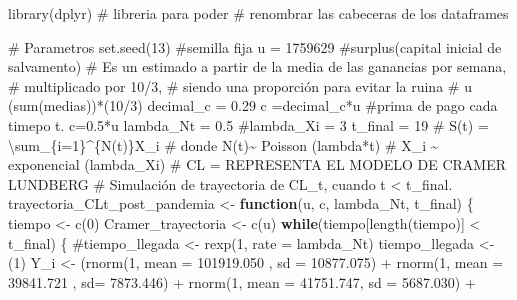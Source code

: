 \documentclass[
  us-letterpaper,
]{scrreprt}
\newenvironment{Shaded}{\begin{snugshade}}{\end{snugshade}}
\newcommand{\AttributeTok}[1]{\textcolor[rgb]{0.40,0.45,0.13}{#1}}
\newcommand{\CommentTok}[1]{\textcolor[rgb]{0.37,0.37,0.37}{#1}}
\newcommand{\ControlFlowTok}[1]{\textcolor[rgb]{0.00,0.23,0.31}{\textbf{#1}}}
\newcommand{\DecValTok}[1]{\textcolor[rgb]{0.68,0.00,0.00}{#1}}
\newcommand{\FloatTok}[1]{\textcolor[rgb]{0.68,0.00,0.00}{#1}}
\newcommand{\FunctionTok}[1]{\textcolor[rgb]{0.28,0.35,0.67}{#1}}
\newcommand{\NormalTok}[1]{\textcolor[rgb]{0.00,0.23,0.31}{#1}}
\newcommand{\OtherTok}[1]{\textcolor[rgb]{0.00,0.23,0.31}{#1}}
\newcommand{\SpecialCharTok}[1]{\textcolor[rgb]{0.37,0.37,0.37}{#1}}
\theoremstyle{definition}
\theoremstyle{plain}
\theoremstyle{plain}
\theoremstyle{remark}
\begin{document}
\begin{Shaded}
\begin{Highlighting}[]
\FunctionTok{library}\NormalTok{(dplyr) }\CommentTok{\# libreria para poder }
\CommentTok{\# renombrar las cabeceras de los dataframes}

\CommentTok{\# Parametros}
\FunctionTok{set.seed}\NormalTok{(}\DecValTok{13}\NormalTok{) }\CommentTok{\#semilla fija}
\NormalTok{u }\OtherTok{=} \DecValTok{1759629} \CommentTok{\#surplus(capital inicial de salvamento)}
\CommentTok{\# Es un estimado a partir de la media de las ganancias por semana, }
\CommentTok{\# multiplicado por 10/3, }
\CommentTok{\# siendo una proporción para evitar la ruina}
\CommentTok{\# u (sum(medias))*(10/3)}
\NormalTok{decimal\_c }\OtherTok{=} \FloatTok{0.29}
\NormalTok{c }\OtherTok{=}\NormalTok{decimal\_c}\SpecialCharTok{*}\NormalTok{u }\CommentTok{\#prima de pago cada timepo t. c=0.5*u}
\NormalTok{lambda\_Nt }\OtherTok{=} \FloatTok{0.5}
\CommentTok{\#lambda\_Xi = 3}
\NormalTok{t\_final }\OtherTok{=} \DecValTok{19}
\CommentTok{\# S(t) = \textbackslash{}sum\_\{i=1\}\^{}\{N(t)\}X\_i}
\CommentTok{\# donde N(t)\textasciitilde{} Poisson (lambda*t)}
\CommentTok{\# X\_i \textasciitilde{} exponencial (lambda\_Xi)}
\CommentTok{\# CL = REPRESENTA EL MODELO DE CRAMER LUNDBERG}
\CommentTok{\# Simulación de trayectoria de CL\_t, cuando t \textless{} t\_final.}
\NormalTok{trayectoria\_CLt\_post\_pandemia }\OtherTok{\textless{}{-}} \ControlFlowTok{function}\NormalTok{(u, c, lambda\_Nt, t\_final)}
\NormalTok{\{}
\NormalTok{  tiempo }\OtherTok{\textless{}{-}} \FunctionTok{c}\NormalTok{(}\DecValTok{0}\NormalTok{)}
\NormalTok{  Cramer\_trayectoria }\OtherTok{\textless{}{-}} \FunctionTok{c}\NormalTok{(u)}
  \ControlFlowTok{while}\NormalTok{(tiempo[}\FunctionTok{length}\NormalTok{(tiempo)] }\SpecialCharTok{\textless{}}\NormalTok{ t\_final)}
\NormalTok{  \{}
    \CommentTok{\#tiempo\_llegada \textless{}{-} rexp(1, rate = lambda\_Nt)}
\NormalTok{    tiempo\_llegada }\OtherTok{\textless{}{-}}\NormalTok{ (}\DecValTok{1}\NormalTok{)}
\NormalTok{    Y\_i }\OtherTok{\textless{}{-}}\NormalTok{  (}\FunctionTok{rnorm}\NormalTok{(}\DecValTok{1}\NormalTok{, }\AttributeTok{mean =} \FloatTok{101919.050}\NormalTok{ , }\AttributeTok{sd =} \FloatTok{10877.075}\NormalTok{) }\SpecialCharTok{+} 
              \FunctionTok{rnorm}\NormalTok{(}\DecValTok{1}\NormalTok{, }\AttributeTok{mean =}  \FloatTok{39841.721}\NormalTok{ , }\AttributeTok{sd=} \FloatTok{7873.446}\NormalTok{)  }\SpecialCharTok{+}  
              \FunctionTok{rnorm}\NormalTok{(}\DecValTok{1}\NormalTok{, }\AttributeTok{mean =}   \FloatTok{41751.747}\NormalTok{, }\AttributeTok{sd =} \FloatTok{5687.030}\NormalTok{) }\SpecialCharTok{+} 

\end{Highlighting}
\end{Shaded}
\end{document}
